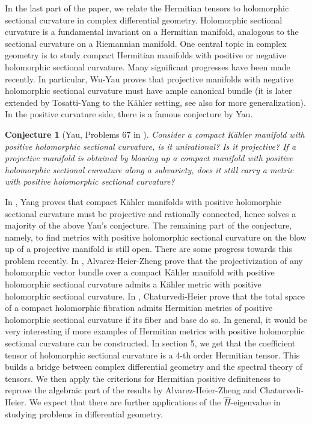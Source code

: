 \documentclass[10pt,reqno]{amsart}
\newtheorem{conj}[thm]{Conjecture}
\theoremstyle{definition}
\begin{document}
In the last part of the paper, we relate the Hermitian tensors to holomorphic sectional curvature in complex differential geometry. Holomorphic sectional curvature is a fundamental invariant on a Hermitian manifold, analogous to the sectional curvature on a Riemannian manifold. One central topic in complex geometry is to study compact Hermitian manifolds with positive or negative holomorphic sectional curvature. Many significant progresses have been made recently. In particular, Wu-Yau \cite{WY1} proves that projective manifolds with negative holomorphic sectional curvature must have ample canonical bundle (it is later extended by Tosatti-Yang \cite{TY} to the K\"ahler setting, see also \cite{DT}\cite{WY2}\cite{YZ} for more generalization). In the positive curvature side, there is a famous conjecture by Yau.

\begin{conj} [Yau, Problems 67 in \cite{Yau}] Consider a compact K\"ahler manifold with positive holomorphic sectional curvature, is it
unirational? Is it projective? If a projective manifold is obtained by blowing
up a compact manifold with positive holomorphic sectional curvature along
a subvariety, does it still carry a metric with positive holomorphic sectional
curvature?
\end{conj}

In \cite{Y}, Yang proves that compact K\"ahler manifolds with positive holomorphic sectional curvature must be projective and rationally connected, hence solves a majority of the above Yau's conjecture. The remaining part of the conjecture, namely, to find metrics with positive holomorphic sectional
curvature on the blow up of a projective manifold is still open. There are some progress towards this problem recently. In \cite{AHZ}, Alvarez-Heier-Zheng prove that the projectivization of any holomorphic vector bundle over a compact K\"ahler manifold with positive holomorphic sectional curvature admits a K\"ahler metric with positive holomorphic sectional curvature. In \cite{CH}, Chaturvedi-Heier prove that the total space of a compact holomorphic fibration
admits Hermitian metrics of positive holomorphic sectional curvature if its fiber and base do so. In general, it would be very interesting if more examples of Hermitian metrics with positive holomorphic sectional curvature can be constructed. In section 5, we get that the coefficient tensor of holomorphic sectional curvature is a 4-th order Hermitian tensor. This builds a bridge between complex differential geometry and the spectral theory of tensors. We then apply the criterions for Hermitian positive definiteness to reprove the algebraic part of the results by Alvarez-Heier-Zheng and Chaturvedi-Heier. 
We expect that there are further applications of the $\hat{H}$-eigenvalue in studying problems in differential geometry.
\end{document}
